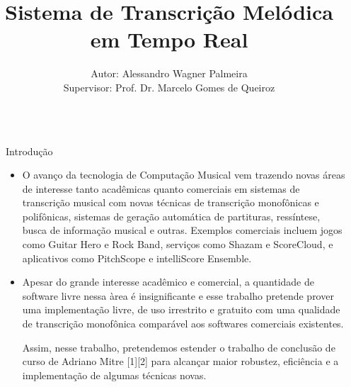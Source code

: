 \documentclass[final,hyperref={pdfpagelabels=false}]{beamer}
\title{\huge Sistema de Transcrição Melódica em Tempo Real} %
\author{Autor: Alessandro Wagner Palmeira \\ Supervisor: Prof. Dr. Marcelo Gomes de Queiroz} %
\institute{Instituto de Matemática e Estatística - Universidade de São Paulo} %
\begin{document}

\begin{frame}[t] %

\begin{columns}[t] %

\begin{column}{.02\textwidth}\end{column} %

\begin{column}{.465\textwidth} %


\begin{block}{Introdução}

\begin{itemize}
\item O avanço da tecnologia de Computação Musical vem trazendo novas áreas de interesse tanto acadêmicas quanto comerciais em sistemas de transcrição musical com novas técnicas de transcrição monofônicas e polifônicas, sistemas de geração automática de partituras, ressíntese, busca de informação musical e outras. Exemplos comerciais incluem jogos como Guitar Hero e Rock Band, serviços como Shazam e ScoreCloud, e aplicativos como PitchScope e intelliScore Ensemble.

\item Apesar do grande interesse acadêmico e comercial, a quantidade de software livre nessa àrea é insignificante e esse trabalho pretende prover uma implementação livre, de uso irrestrito e gratuito com uma qualidade de transcrição monofônica comparável aos softwares comerciais existentes.

Assim, nesse trabalho, pretendemos estender o trabalho de conclusão de curso de Adriano Mitre [1][2] para alcançar maior robustez, eficiência e a implementação de algumas técnicas novas.
\end{itemize}

\end{block}


\end{column}
\end{columns}
\end{frame}
\end{document}
